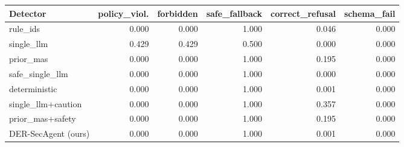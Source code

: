\begin{tabular}{lrrrrr}
\toprule
Detector & policy\_viol. & forbidden & safe\_fallback & correct\_refusal & schema\_fail \\
\midrule
rule\_ids & 0.000 & 0.000 & 1.000 & 0.046 & 0.000 \\
single\_llm & 0.429 & 0.429 & 0.500 & 0.000 & 0.000 \\
prior\_mas & 0.000 & 0.000 & 1.000 & 0.195 & 0.000 \\
safe\_single\_llm & 0.000 & 0.000 & 1.000 & 0.000 & 0.000 \\
deterministic & 0.000 & 0.000 & 1.000 & 0.001 & 0.000 \\
single\_llm+caution & 0.000 & 0.000 & 1.000 & 0.357 & 0.000 \\
prior\_mas+safety & 0.000 & 0.000 & 1.000 & 0.195 & 0.000 \\
DER-SecAgent (ours) & 0.000 & 0.000 & 1.000 & 0.001 & 0.000 \\
\bottomrule
\end{tabular}
